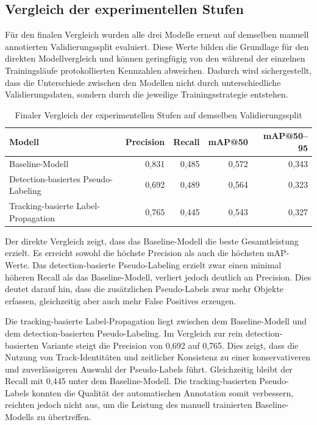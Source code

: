 \subsection{Vergleich der experimentellen Stufen}

Für den finalen Vergleich wurden alle drei Modelle erneut auf demselben manuell
annotierten Validierungssplit evaluiert. Diese Werte bilden die Grundlage für den
direkten Modellvergleich und können geringfügig von den während der einzelnen
Trainingsläufe protokollierten Kennzahlen abweichen. Dadurch wird sichergestellt,
dass die Unterschiede zwischen den Modellen nicht durch unterschiedliche
Validierungsdaten, sondern durch die jeweilige Trainingsstrategie entstehen.

\begin{table}[H]
    \centering
    \caption{Finaler Vergleich der experimentellen Stufen auf demselben Validierungssplit}
    \label{tab:final_model_comparison}
    \small
    \begin{tabular}{p{5.4cm}rrrr}
        \hline
        \textbf{Modell}                     & \textbf{Precision} & \textbf{Recall} & \textbf{mAP@50} & \textbf{mAP@50--95} \\
        \hline
        Baseline-Modell                     & 0{,}831            & 0{,}485         & 0{,}572         & 0{,}343             \\
        Detection-basiertes Pseudo-Labeling & 0{,}692            & 0{,}489         & 0{,}564         & 0{,}323             \\
        Tracking-basierte Label-Propagation & 0{,}765            & 0{,}445         & 0{,}543         & 0{,}327             \\
        \hline
    \end{tabular}
\end{table}

Der direkte Vergleich zeigt, dass das Baseline-Modell die beste Gesamtleistung
erzielt. Es erreicht sowohl die höchste Precision als auch die höchsten mAP-Werte.
Das detection-basierte Pseudo-Labeling erzielt zwar einen minimal höheren Recall
als das Baseline-Modell, verliert jedoch deutlich an Precision. Dies deutet darauf
hin, dass die zusätzlichen Pseudo-Labels zwar mehr Objekte erfassen, gleichzeitig
aber auch mehr False Positives erzeugen.

Die tracking-basierte Label-Propagation liegt zwischen dem Baseline-Modell und
dem detection-basierten Pseudo-Labeling. Im Vergleich zur rein detection-basierten
Variante steigt die Precision von 0{,}692 auf 0{,}765. Dies zeigt, dass die Nutzung
von Track-Identitäten und zeitlicher Konsistenz zu einer konservativeren und
zuverlässigeren Auswahl der Pseudo-Labels führt. Gleichzeitig bleibt der Recall
mit 0{,}445 unter dem Baseline-Modell. Die tracking-basierten Pseudo-Labels
konnten die Qualität der automatischen Annotation somit verbessern, reichten
jedoch nicht aus, um die Leistung des manuell trainierten Baseline-Modells zu
übertreffen.

